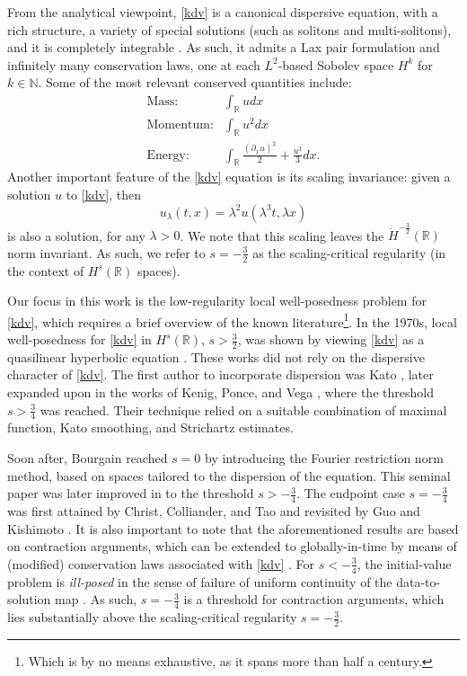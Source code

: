 \documentclass[a4paper,
11pt,  reqno]{amsart}
\newcommand{\5}{\textup{V}}
\newcommand{\dx}{\partial_x}
\theoremstyle{remark}
\newcommand{\R}{\mathbb{R}}
\newcommand{\N}{\mathbb{N}}
\numberwithin{equation}{section}
\numberwithin{theorem}{section}
\begin{document}
	\medskip


From the analytical viewpoint, \eqref{kdv} is a canonical dispersive equation, with a rich structure, a variety of special solutions (such as solitons and multi-solitons), and it is completely integrable \cite{ZakharovFadeev}. As such, it admits a Lax pair formulation and infinitely many conservation laws, one at each $L^2$-based Sobolev space $H^k$ for $k\in\N$. Some of the most relevant conserved quantities include:
\begin{align*}
\text{Mass:}& \int_\R u dx\\
\text{Momentum:}& \int_\R u^2 dx\\
\text{Energy:}& \int_\R \frac{(\dx u)^2}{2} + \frac{u^3}{3}  dx.
\end{align*}
Another important feature of the \eqref{kdv} equation is its scaling invariance: given a solution $u$ to \eqref{kdv}, then
\begin{equation}\label{scaling}
u_\lambda(t,x)=\lambda^{2}u(\lambda^3 t, \lambda x)
\end{equation}
is also a solution, for any $\lambda>0$. We note that this scaling leaves the $\dot H^{-\frac32}(\R)$ norm invariant. As such, we refer to $s=-\frac32$ as the scaling-critical regularity (in the context of $H^s(\R)$ spaces).

\medskip

Our focus in this work is the low-regularity local well-posedness problem for \eqref{kdv}, which requires a brief overview of the known literature{\footnote{Which is by no means exhaustive, as it spans more than half a century.}}. In the 1970s, local well-posedness for \eqref{kdv} in $H^s(\R)$, $s>\frac32$, was shown by viewing \eqref{kdv} as a quasilinear hyperbolic equation \cite{BonaSmith, Kato_kdv, SautTemam, TsutsumiMukasa}. These works did not rely on the dispersive character of \eqref{kdv}. The first {author} to incorporate dispersion was Kato \cite{Kato_kdv_disp}, later expanded upon in the works of Kenig, Ponce, and Vega \cite{KPV91, KPV_gkdv}, where {the threshold $s>\frac34$ was reached}. Their technique relied on a suitable combination of maximal function, Kato smoothing, and Strichartz estimates.

\medskip


Soon after, Bourgain \cite{bourg2} reached $s=0$ by introducing the Fourier restriction norm method,
based on spaces tailored to the dispersion of the equation. This seminal paper was later improved in \cite{kpv_bilin} to the threshold $s>-\frac34$. The endpoint case $s=-\frac34$ was first attained by Christ, Colliander, and Tao \cite{CCT_ill} and revisited by Guo \cite{Guo_gwp} and Kishimoto \cite{Kishimoto_lwp_crit}. It is also important to note that the aforementioned results are based on contraction arguments, which can be extended to globally-in-time by means
 of (modified) conservation laws associated with \eqref{kdv}  \cite{bourg2, CKSTT_sharp_kdv, Guo_gwp}. For $s<-\frac34$, the initial-value problem is \emph{ill-posed} in the sense of failure of uniform continuity of the data-to-solution map \cite{KPV_ill}. As such, $s=-\frac34$ is a threshold for contraction arguments, which lies substantially above the
scaling-critical regularity $s=-\frac32$.
\end{document}
